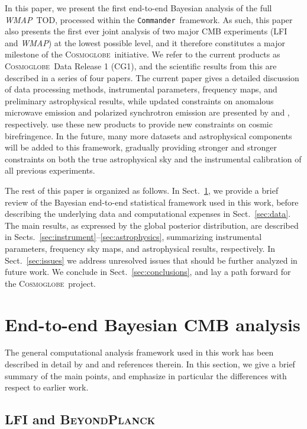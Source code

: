 \documentclass[twocolumn]{../../common/aa}
\def\WMAP{\emph{WMAP}}
\def\commander{\texttt{Commander}}
\newcommand{\bp}{\textsc{BeyondPlanck}}
\newcommand{\cosmoglobe}{\textsc{Cosmoglobe}}
\begin{document}
In this paper, we present the first end-to-end Bayesian analysis of the full \WMAP\ TOD, processed within the \commander\ framework. As such, this paper also presents the first ever joint analysis of two major CMB experiments (LFI and \WMAP) at the lowest possible level, and it therefore constitutes a major milestone of the \cosmoglobe\ initiative. We refer to the current products as \cosmoglobe\ Data Release 1 (CG1), and the scientific results from this are described in a series of four papers. The current paper gives a detailed discussion of data processing methods, instrumental parameters, frequency maps, and preliminary astrophysical results, while updated constraints on anomalous microwave emission and polarized synchrotron emission are presented by \citet{watts2023_ame} and \citet{fuskeland:2023}, respectively. \citet{eskilt:2023} use these new products to provide new constraints on cosmic birefringence. In the future, many more datasets and astrophysical components will be added to this framework, gradually providing stronger and stronger constraints on both the true astrophysical sky and the instrumental calibration of all previous experiments. 

The rest of this paper is organized as follows. In Sect.~\ref{sec:methods}, we provide a brief review of the Bayesian end-to-end statistical framework used in this work, before describing the underlying data and computational expenses in Sect.~\ref{sec:data}. The main results, as expressed by the global posterior distribution, are described in Sects.~\ref{sec:instrument}--\ref{sec:astrophysics}, summarizing instrumental parameters, frequency sky maps, and astrophysical results, respectively. In Sect.~\ref{sec:issues} we address unresolved issues that should be further analyzed in future work. We conclude in Sect.~\ref{sec:conclusions}, and lay a path forward for the \cosmoglobe\ project.

\section{End-to-end Bayesian CMB analysis}
\label{sec:methods}

The general computational analysis framework used in this work has been described in detail by \citet{bp01} and \citet{bp17} and references therein. In this section, we give a brief summary of the main points, and emphasize in particular the differences with respect to earlier work. 

\subsection{LFI and \bp}
\label{sec:lfi_bp}
\end{document}
